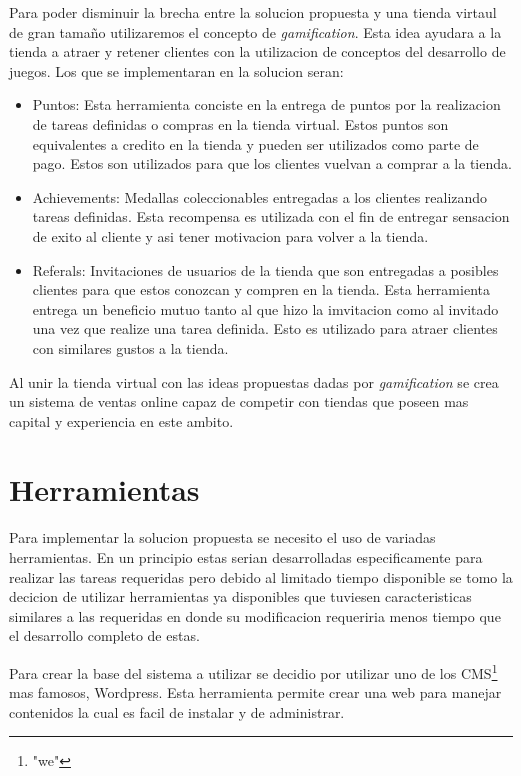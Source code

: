 Para poder disminuir la brecha entre la solucion propuesta y una tienda virtaul de gran tamaño utilizaremos el
concepto de \emph{gamification}. Esta idea ayudara a la tienda a atraer y retener clientes con la utilizacion
de conceptos del desarrollo de juegos. Los que se implementaran en la solucion seran:

\begin{itemize}

\item Puntos: Esta herramienta conciste en la entrega de puntos por la realizacion de tareas definidas o compras
 en la tienda virtual. Estos puntos son equivalentes a credito en la tienda y pueden ser utilizados como 
parte de pago. Estos son utilizados para que los clientes vuelvan a comprar a la tienda.
\item Achievements: Medallas coleccionables entregadas a los clientes realizando tareas definidas. Esta 
recompensa es utilizada con el fin de entregar sensacion de exito al cliente y asi tener motivacion para volver
a la tienda.
\item Referals: Invitaciones de usuarios de la tienda que son entregadas a posibles clientes para que estos 
conozcan y compren en la tienda. Esta herramienta entrega un beneficio mutuo tanto al que hizo la imvitacion
como al invitado una vez que realize una tarea definida. Esto es utilizado para atraer clientes con similares
gustos a la tienda.

\end{itemize}

Al unir la tienda virtual con las ideas propuestas dadas por \emph{gamification} se crea un sistema de ventas online
capaz de competir con tiendas que poseen mas capital y experiencia en este ambito.


\section{Herramientas}

Para implementar la solucion propuesta se necesito el uso de variadas herramientas. En un principio estas
serian desarrolladas especificamente para realizar las tareas requeridas pero debido al limitado tiempo
disponible se tomo la decicion de utilizar herramientas ya disponibles que tuviesen caracteristicas
similares a las requeridas en donde su modificacion requeriria menos tiempo que el desarrollo completo
de estas.

Para crear la base del sistema a utilizar se decidio por utilizar uno de los CMS\footnote{"we"} mas 
famosos, Wordpress. Esta herramienta permite crear una web para manejar contenidos la cual es facil
de instalar y de administrar. 

